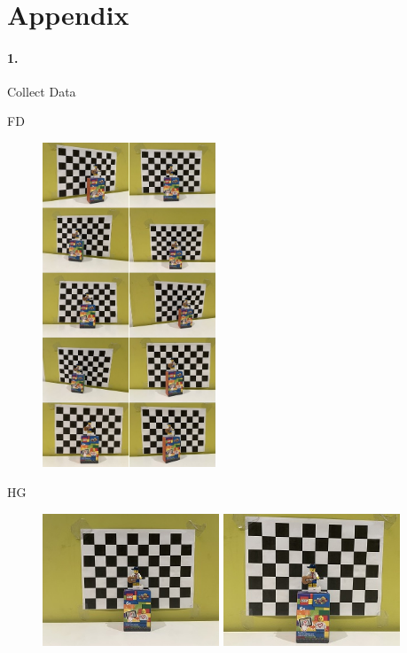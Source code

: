 \documentclass[10pt,twocolumn,letterpaper]{article}
\begin{document}
~\\

\section*{Appendix}

\paragraph{1.}Collect Data

\noindent FD

\begin{figure}[h]
\begin{center}
   \includegraphics[width=0.46\textwidth]{FD}
\end{center}
\end{figure}


\noindent HG

\begin{figure}[h]
\begin{center}
   \includegraphics[width=0.47\textwidth]{HG1_ORI}
   \includegraphics[width=0.47\textwidth]{HG1_X1.2+ROT RIGHT}
\end{center}
\end{figure}
\end{document}
